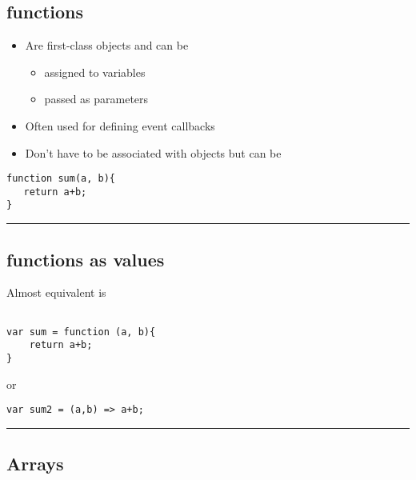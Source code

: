 \documentclass{article}[18pt]
\providecommand{\tightlist}{%
  \setlength{\itemsep}{0pt}\setlength{\parskip}{0pt}}
\begin{document}
\hypertarget{functions}{%
\subsection{functions}\label{functions}}

\begin{itemize}
\tightlist
\item
  Are first-class objects and can be

  \begin{itemize}
  \tightlist
  \item
    assigned to variables
  \item
    passed as parameters
  \end{itemize}
\item
  Often used for defining event callbacks
\item
  Don't have to be associated with objects but can be
\end{itemize}

\begin{verbatim}
function sum(a, b){
   return a+b;
}
\end{verbatim}

\begin{center}\rule{0.5\linewidth}{\linethickness}\end{center}

\hypertarget{functions-as-values}{%
\subsection{functions as values}\label{functions-as-values}}

Almost equivalent is

\begin{verbatim}

var sum = function (a, b){
    return a+b;
}
\end{verbatim}

or

\begin{verbatim}
var sum2 = (a,b) => a+b;

\end{verbatim}

\begin{center}\rule{0.5\linewidth}{\linethickness}\end{center}

\hypertarget{arrays}{%
\subsection{Arrays}\label{arrays}}
\end{document}
